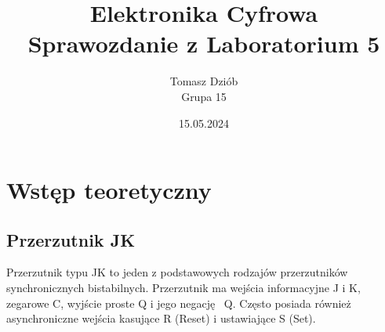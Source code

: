 \documentclass{article}
\begin{document}
  \pagestyle{fancy} %
  \fancyhf{} %
  \fancyfoot[C]{\thepage}
  \renewcommand{\headrulewidth}{0pt} %
  \renewcommand{\footrulewidth}{0.4pt} %
  \addtolength{\footskip}{0cm} %

  \title{Elektronika Cyfrowa \\ {\large Sprawozdanie z Laboratorium 5}}
  \date{15.05.2024}
  \author{Tomasz Dziób\\{\small Grupa 15}}
  \maketitle

  \setcounter{tocdepth}{4} %
  \setcounter{secnumdepth}{4} %
  \small \tableofcontents
  \pagebreak

  \section{Wstęp teoretyczny}
    \subsection{Przerzutnik JK}
      Przerzutnik typu JK to jeden z podstawowych rodzajów przerzutników synchronicznych bistabilnych. Przerzutnik ma wejścia informacyjne J i K, zegarowe C, wyjście proste Q i jego negację ~Q. Często posiada również asynchroniczne wejścia kasujące R (Reset) i ustawiające S (Set).
\end{document}
